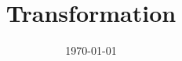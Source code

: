 \documentclass[11pt]{report}
\title{\textbf{Transformation}} %
\author{\scribe} %
\date{\today} %
\begin{document}
\maketitle	
\tableofcontents
\chapter{}

\chapter{}

\chapter{}

\chapter{}

\chapter{}

\newpage
\appendix
\chapter{}

\end{document}
